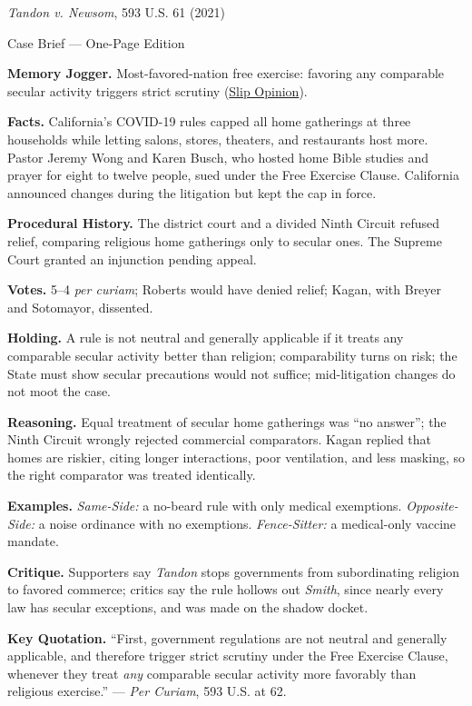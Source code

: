 \documentclass[12pt]{article}
\begin{document}
\begin{center}
{\Large \textit{Tandon v. Newsom}, 593 U.S. 61 (2021)\par}
\vspace{0.3em}
{\normalsize Case Brief --- One-Page Edition\par}
\end{center}

\textbf{Memory Jogger.} Most-favored-nation free exercise: favoring any comparable secular activity triggers strict scrutiny (\href{https://www.supremecourt.gov/opinions/20pdf/20a151_4g15.pdf}{Slip Opinion}).

\textbf{Facts.} California's COVID-19 rules capped all home gatherings at three households while letting salons, stores, theaters, and restaurants host more. Pastor Jeremy Wong and Karen Busch, who hosted home Bible studies and prayer for eight to twelve people, sued under the Free Exercise Clause. California announced changes during the litigation but kept the cap in force.

\textbf{Procedural History.} The district court and a divided Ninth Circuit refused relief, comparing religious home gatherings only to secular ones. The Supreme Court granted an injunction pending appeal.

\textbf{Votes.} 5--4 \textit{per curiam}; Roberts would have denied relief; Kagan, with Breyer and Sotomayor, dissented.

\textbf{Holding.} A rule is not neutral and generally applicable if it treats any comparable secular activity better than religion; comparability turns on risk; the State must show secular precautions would not suffice; mid-litigation changes do not moot the case.

\textbf{Reasoning.} Equal treatment of secular home gatherings was ``no answer''; the Ninth Circuit wrongly rejected commercial comparators. Kagan replied that homes are riskier, citing longer interactions, poor ventilation, and less masking, so the right comparator was treated identically.

\textbf{Examples.} \emph{Same-Side:} a no-beard rule with only medical exemptions. \emph{Opposite-Side:} a noise ordinance with no exemptions. \emph{Fence-Sitter:} a medical-only vaccine mandate.

\textbf{Critique.} Supporters say \textit{Tandon} stops governments from subordinating religion to favored commerce; critics say the rule hollows out \textit{Smith}, since nearly every law has secular exceptions, and was made on the shadow docket.

\textbf{Key Quotation.} ``First, government regulations are not neutral and generally applicable, and therefore trigger strict scrutiny under the Free Exercise Clause, whenever they treat \textit{any} comparable secular activity more favorably than religious exercise.'' --- \textit{Per Curiam}, 593 U.S. at 62.
\end{document}
